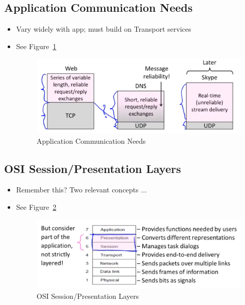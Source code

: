 \documentclass[12pt]{ctexart}   %
\begin{document}
	\subsection{Application Communication Needs}
	\begin{itemize}
		\item Vary widely with app; must build on Transport services
		\item See Figure~\ref{fig:8-1-3}
		  
		 \begin{figure}[h!] %
		\centering
		 \includegraphics[scale=0.7]{images/8-1-3}
		\caption{ Application Communication Needs }
		 \label{fig:8-1-3}
		 \end{figure}
	\end{itemize}
	
	\subsection{OSI Session/Presentation Layers}
	\begin{itemize}
		\item Remember this? Two relevant concepts ...
		\item See Figure~\ref{fig:8-1-4}
		  
		 \begin{figure}[h!] %
		\centering
		 \includegraphics[scale=0.7]{images/8-1-4}
		\caption{ OSI Session/Presentation Layers }
		 \label{fig:8-1-4}
		 \end{figure}
	\end{itemize}
	
\end{document}

